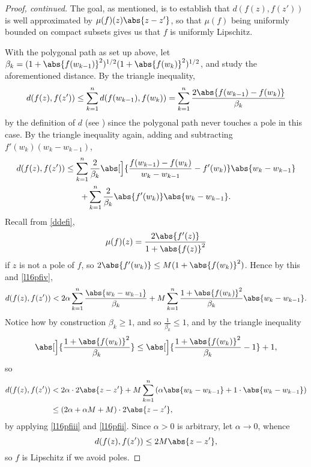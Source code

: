 


\begin{proof}[Proof, continued]
	The goal, as mentioned, is to establish that $d(f(z), f(z'))$ is well approximated by $\mu(f)(z) \abs{z - z'}$, so that $\mu(f)$ being uniformly bounded on compact subsets gives us that $f$ is uniformly Lipschitz.

	With the polygonal path as set up above, let $\beta_k = (1 + \abs{f(w_{k - 1})}^2)^{1/2} (1 + \abs{f(w_k)}^2)^{1/2}$, and study the aforementioned distance.
	By the triangle inequality,
	\[
		d(f(z), f(z')) \leq \sum_{k = 1}^n d(f(w_{k - 1}), f(w_k)) = \sum_{k = 1}^n \frac{2 \abs{f(w_{k - 1}) - f(w_k)}}{\beta_k}
	\]
	by the definition of $d$ (see ) since the polygonal path never touches a pole in this case.
	By the triangle inequality again, adding and subtracting $f'(w_k) (w_k - w_{k - 1})$,
	\begin{gather*}
		d(f(z), f(z')) \leq \sum_{k = 1}^n \frac{2}{\beta_k} \abs[\Big]{\frac{f(w_{k - 1}) - f(w_k)}{w_k - w_{k - 1}} - f'(w_k)} \abs{w_k - w_{k - 1}} \\ + \sum_{k = 1}^n \frac{2}{\beta_k} \abs{f'(w_k)} \abs{w_k - w_{k - 1}}.
	\end{gather*}
	Recall from \ref{ddefi},
	\[
		\mu(f)(z) = \frac{2 \abs{f'(z)}}{1 + \abs{f(z)}^2}
	\]
	if $z$ is not a pole of $f$, so $2 \abs{f'(w_k)} \leq M(1 + \abs{f(w_k)}^2)$.
	Hence by this and \ref{l16pfiv},
	\[
		d(f(z), f(z')) < 2 \alpha \sum_{k = 1}^n \frac{\abs{w_k - w_{k - 1}}}{\beta_k} + M \sum_{k = 1}^n \frac{1 + \abs{f(w_k)}^2}{\beta_k} \abs{w_k - w_{k - 1}}.
	\]
	Notice how by construction $\beta_k \geq 1$, and so $\frac{1}{\beta_k} \leq 1$, and by the triangle inequality
	\[
		\abs[\Big]{\frac{1 + \abs{f(w_k)}^2}{\beta_k}} \leq \abs[\Big]{\frac{1 + \abs{f(w_k)}^2}{\beta_k} - 1} + 1,
	\]
	so
	\begin{align*}
		d(f(z), f(z')) &< 2 \alpha \cdot 2 \abs{z - z'} + M \sum_{k = 1}^n \left ( \alpha \abs{w_k - w_{k - 1}} + 1 \cdot \abs{w_k - w_{k - 1}} \right ) \\
		&\leq (2 \alpha + \alpha M + M) \cdot 2 \abs{z - z'},
	\end{align*}
	by applying \ref{l16pfiii} and \ref{l16pfii}.
	Since $\alpha > 0$ is arbitrary, let $\alpha \to 0$, whence
	\[
		d(f(z), f(z')) \leq 2 M \abs{z - z'},
	\]
	so $f$ is Lipschitz if we avoid poles.


\end{proof}
